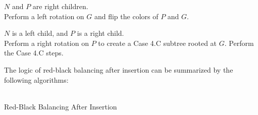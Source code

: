 \begin{description}[1cm]
\begin{description}[1cm]
		\item[\underline{Case 4.C}:] $N$ and $P$ are right children. \\
		
		Perform a left rotation on $G$ and flip the colors of $P$ and $G$. \\
		
		\item[\underline{Case 4.D}:] $N$ is a left child, and $P$ is a right child. \\
		
		Perform a right rotation on $P$ to create a Case 4.C subtree rooted at $G$. Perform the Case 4.C steps. \\
	\end{description}
\end{description}

The logic of red-black balancing after insertion can be summarized by the following algorithms: \\\\

\begin{algorithm}[H]
	\caption{Red-Black Balancing After Insertion}
\end{algorithm}
\vspace{5mm}

